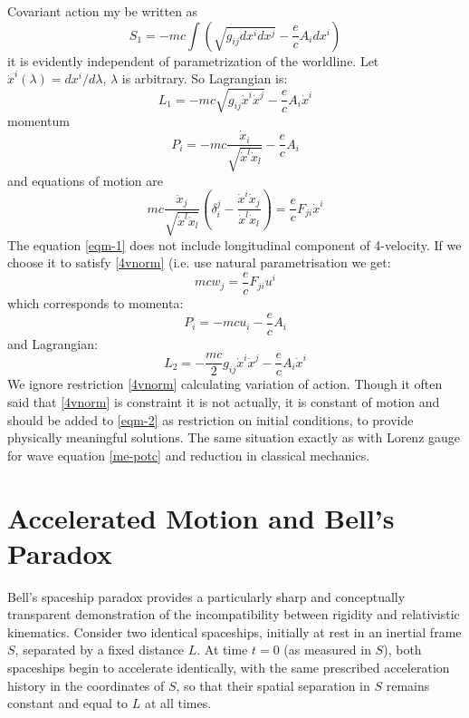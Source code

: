 Covariant action my be written as  
\begin{equation}
   \label {act-1}
    S_1=-m c \int (\sqrt{g_{i j} d x^i d x^j}  - \frac{e}{c} A_i d x^i)
\end{equation}
it is evidently independent of parametrization of the worldline. 
Let $ \dot x^i (\lambda)=d x^i / d \lambda $, $ \lambda $ is 
arbitrary. So Lagrangian is:
\begin{equation}
   \label {lag-1}
    L_1=-m c \sqrt{g_{i j} \dot x^i \dot x^j} -\frac{e}{c} A_i \dot x^i
\end{equation}
momentum 
\begin{equation}
   \label {mom-1}
   P_i = -m c \frac{\dot x_i}{\sqrt{\dot x^l \dot x_l}} -\frac{e}{c} A_i
\end{equation}
and equations of motion are
\begin{equation}
   \label {eqm-1}
    m c \frac{\ddot x_j}{\sqrt{\dot x^l \dot x_l}} (\delta_i^j -
    \frac{\dot x^i \dot x_j}{\dot x^l \dot x_l}) = \frac{e}{c} F_{j i} \dot x^i
\end{equation}
The equation \eqref{eqm-1} does not include longitudinal component of 
4-velocity. If we choose it to satisfy \eqref{4vnorm} (i.e. use natural
parametrisation we get:
\begin{equation}
   \label {eqm-2}
    m c w_j = \frac{e}{c} F_{j i} u^i
\end{equation}
which corresponds to momenta:
\begin{equation}
   \label {mom-2}
   P_i = -m c  u_i -\frac{e}{c} A_i
\end{equation}
and Lagrangian:
\begin{equation}
   \label {lag-2}
    L_2=- \frac{m c}{2} g_{i j} \dot x^i \dot x^j -\frac{e}{c} A_i \dot x^i
\end{equation}
We ignore restriction \eqref{4vnorm} calculating variation of action. 
Though it often said that \eqref{4vnorm} is constraint it is not
actually, it is constant of motion and should be added to \eqref{eqm-2}
as restriction on initial conditions, to provide physically meaningful
solutions. The same situation exactly as with Lorenz gauge for wave
equation \eqref{me-potc} and reduction in classical mechanics.

\section{Accelerated Motion and Bell's Paradox}
\label{sec:sr-bell}
Bell's spaceship paradox provides a particularly sharp and conceptually
transparent demonstration of the incompatibility between rigidity and
relativistic kinematics. Consider two identical spaceships, initially at rest
in an inertial frame $S$, separated by a fixed distance $L$. At time $t=0$ (as
measured in $S$), both spaceships begin to accelerate identically, with the
same prescribed acceleration history in the coordinates of $S$, so that their
spatial separation in $S$ remains constant and equal to $L$ at all times.

